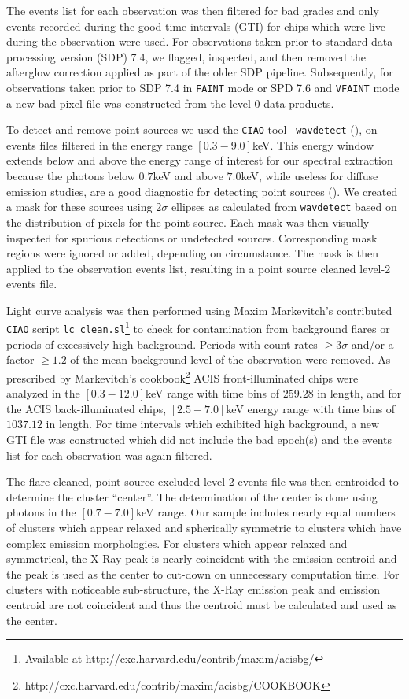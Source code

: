 \documentclass[12pt, preprint]{aastex}
\begin{document}
The events list for each observation was then filtered for bad
grades and only events recorded during the good time intervals (GTI)
for chips which were live during the observation were used. For
observations taken prior to standard data processing version (SDP)
7.4, we flagged, inspected, and then removed the afterglow correction
applied as part of the older SDP pipeline. Subsequently, for observations taken
prior to SDP 7.4 in {\tt FAINT} mode or SPD 7.6 and {\tt VFAINT} mode a new
bad pixel file was constructed from the level-0 data products.

To detect and remove point sources we used the {\tt CIAO} tool {\tt
wavdetect} (\cite{2002ApJS..138..185F}), on events files filtered in
the energy range $[0.3-9.0]$keV. This energy
window extends below and above the energy range of
interest for our spectral extraction because the photons below $0.7$keV
and above $7.0$keV, while useless for diffuse emission studies, are a
good diagnostic for detecting point sources
(\cite{2000SPIE.4012...17J}). We created a mask for these
sources using $2\sigma$ ellipses as calculated from
{\tt wavdetect} based on the distribution of pixels for the point
source. Each mask was then visually inspected for spurious
detections or undetected sources. Corresponding mask regions were
ignored or added, depending on circumstance. The
mask is then applied to the observation events list, resulting in a point
source cleaned level-2 events file.

Light curve analysis was then performed using Maxim Markevitch's
contributed {\tt CIAO} script {\tt lc\_clean.sl}\footnote{Available at
http://cxc.harvard.edu/contrib/maxim/acisbg/} to check for
contamination from background flares or periods of excessively high
background. Periods with count rates $\geq 3\sigma$
and/or a factor $\geq 1.2$ of the mean background level of the
observation were removed. As prescribed by Markevitch's
cookbook\footnote{http://cxc.harvard.edu/contrib/maxim/acisbg/COOKBOOK}
ACIS front-illuminated chips were analyzed in the $[0.3-12.0]$keV range
with time bins of $259.28$ in length, and for the ACIS back-illuminated
chips, $[2.5-7.0]$keV energy range with time bins of $1037.12$ in
length. For time intervals which exhibited high background, a new GTI
file was constructed which did not include the bad epoch(s) and the
events list for each observation was again filtered.

The flare cleaned, point source excluded level-2 events file was then
centroided to determine the cluster ``center''. The determination of
the center is done using photons in the $[0.7-7.0]$keV range. Our sample includes
nearly equal numbers of clusters which appear relaxed and spherically
symmetric to clusters which have complex emission morphologies. For
clusters which appear relaxed and symmetrical, the X-Ray peak is
nearly coincident with the emission centroid and the peak is used as the
center to cut-down on unnecessary computation time. For clusters with
noticeable sub-structure, the X-Ray emission peak and emission
centroid are not coincident and thus the centroid must be calculated
and used as the center.
\end{document}
